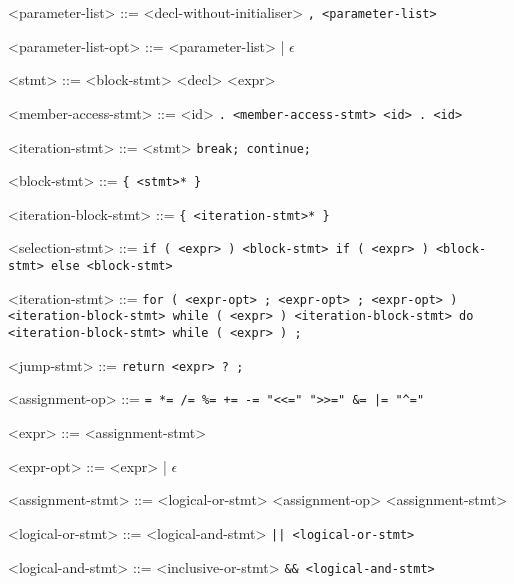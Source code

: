 \documentclass[leqno]{article}
\begin{document}
\begin{grammar}
            <parameter-list> ::= <decl-without-initialiser> \tt{,} <parameter-list>

            <parameter-list-opt> ::= <parameter-list> | $\epsilon$

            <stmt> ::= <block-stmt>
            \alt <decl>
            \alt <expr>
            
            <member-access-stmt> ::= <id> \tt{.} <member-access-stmt>
            \alt <id> \tt{.} <id>

            <iteration-stmt> ::= <stmt>
            \alt \tt{break};
            \alt \tt{continue};
            
            <block-stmt> ::= \tt{\{} <stmt>* \tt{\}}
            
            <iteration-block-stmt> ::= \tt{\{} <iteration-stmt>* \tt{\}}

            <selection-stmt> ::= \tt{if} \tt{(} <expr> \tt{)} <block-stmt>
            \alt \tt{if} \tt{(} <expr> \tt{)} <block-stmt> \tt{else} <block-stmt>

            <iteration-stmt> ::= \tt{for} \tt{(} <expr-opt> \tt{;} <expr-opt> \tt{;} <expr-opt> \tt{)} <iteration-block-stmt>
            \alt \tt{while} \tt{(} <expr> \tt{)} <iteration-block-stmt>
            \alt \tt{do} <iteration-block-stmt> \tt{while} \tt{(} <expr> \tt{)} \tt{;}

            <jump-stmt> ::= \tt{return} <expr> ? \tt{;}

            <assignment-op> ::= \tt{=}
            \alt \tt{*=}
            \alt \tt{/=}
            \alt \tt{\%=}
            \alt \tt{+=}
            \alt \tt{-=}
            \alt \tt{"<<="}
            \alt \tt{">>="}
            \alt \tt{\&=}
            \alt \tt{|=}
            \alt \tt{"^="}

            <expr> ::= <assignment-stmt>

            <expr-opt> ::= <expr> | $\epsilon$

            <assignment-stmt> ::= <logical-or-stmt>
             <assignment-op> <assignment-stmt>

            <logical-or-stmt> ::= <logical-and-stmt>
             \tt{||} <logical-or-stmt>

            <logical-and-stmt> ::= <inclusive-or-stmt>
             \tt{\&\&} <logical-and-stmt>


\end{grammar}
\end{document}
